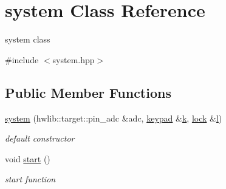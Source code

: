 \hypertarget{classsystem}{}\section{system Class Reference}
\label{classsystem}


system class  




{\ttfamily \#include $<$system.\+hpp$>$}

\subsection*{Public Member Functions}
\begin{DoxyCompactItemize}
\item 
\hyperlink{classsystem_a46d824d1080e04824d21bf851bfdff61}{system} (hwlib\+::target\+::pin\+\_\+adc \&adc, \hyperlink{classkeypad}{keypad} \&\hyperlink{classsystem_a8f63afc4e8e5cbd5b359b7b67d05ddcf}{k}, \hyperlink{classlock}{lock} \&\hyperlink{classsystem_a04508082c7cd8057141df6756329d8d1}{l})
\begin{DoxyCompactList}\small\item\em default constructor \end{DoxyCompactList}\item 
void \hyperlink{classsystem_aa349f5fddd1cb2662e3f753c4669b03a}{start} ()
\begin{DoxyCompactList}\small\item\em start function \end{DoxyCompactList}\end{DoxyCompactItemize}
